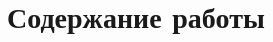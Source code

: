\section*{Содержание работы}
\begin{comment}
Во \underline{\textbf{введении}} обосновывается актуальность
исследований, выполненных в рамках данной диссертационной работы,
приводится краткий обзор научной литературы по изучаемой проблеме,
формулируется цель, ставятся задачи работы, излагается научная новизна
и практическая значимость представленного исследования.

\underline{\textbf{Первая глава}} посвящена обзору области исследования.
Рассматриваются требования к реалистичным моделями памяти
языков программирования, предъявляемые через призму наблюдаемых сценариев поведения многопоточных программ,
применяемых компиляторами оптимизаций, а также моделей памяти процессорных архитектур.
Описывается модель памяти C/C++11. Рассматриваются проблемы модели C/C++11, в том числе
проблема ``значений из воздуха''. Приводится описание существующих слабых моделей памяти без ``значений из воздуха'', в частности, обещающей модели.
На основе выполненного обзора делаются следующие выводы.
\begin{itemize}
  \item Модель памяти промышленного языка программирования должна удовлетворять, как минимум, трём критериям.
    Во-первых, должна существовать корректная схема компиляции в модель целевой процессорной
    архитектуры.
    Во-вторых, основные компиляторные оптимизации должны быть корректны в рамках модели.
    В-третьих, у модели должна отсутствовать проблема ``значений из воздуха''.
  \item При разработке новой модели памяти языка программирования нужно доказывать корректность эффективной компиляции
     в модели памяти целевых процессорных архитектур.
  \item Существующие модели памяти промышленных языков программирования не удовлетворяют всем приведённым выше
    критериям.
  \item Требуется разработать операционную модель памяти с синтаксисом модели C/C++11, которая
    не имеет проблемы ``значений из воздуха''.
\end{itemize}


\end{comment}
